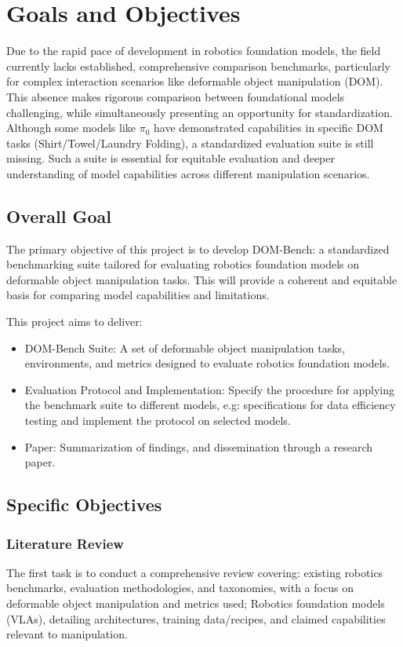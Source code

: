 \section{Goals and Objectives}
Due to the rapid pace of development in robotics foundation models, the field currently lacks established, comprehensive comparison benchmarks,
particularly for complex interaction scenarios like deformable object manipulation (DOM).
This absence makes rigorous comparison between foundational models challenging, while simultaneously presenting an opportunity for standardization.
Although some models like $\pi_0$ \cite{pi_zero} have demonstrated capabilities in specific DOM tasks (Shirt/Towel/Laundry Folding), a standardized evaluation suite is still missing.
Such a suite is essential for equitable evaluation and deeper understanding of model capabilities across different manipulation scenarios.

\subsection{Overall Goal}
The primary objective of this project is to develop DOM-Bench: a standardized benchmarking suite tailored for evaluating robotics foundation models on deformable object manipulation tasks. This will provide a coherent and equitable basis for comparing model capabilities and limitations.

This project aims to deliver:
\begin{itemize}
    \item DOM-Bench Suite: A set of deformable object manipulation tasks, environments, and metrics designed to evaluate robotics foundation models.
    \item Evaluation Protocol and Implementation: Specify the procedure for applying the benchmark suite to different models, e.g: specifications for data efficiency testing and implement the protocol on selected models.
    \item Paper: Summarization of findings, and dissemination through a research paper.
\end{itemize}


\subsection{Specific Objectives}
\vspace{4pt}

\subsubsection{Literature Review} %
The first task is to conduct a comprehensive review covering: existing robotics benchmarks, evaluation methodologies, and taxonomies, with a focus on deformable object manipulation and metrics used; Robotics foundation models (VLAs), detailing architectures, training data/recipes, and claimed capabilities relevant to manipulation.


